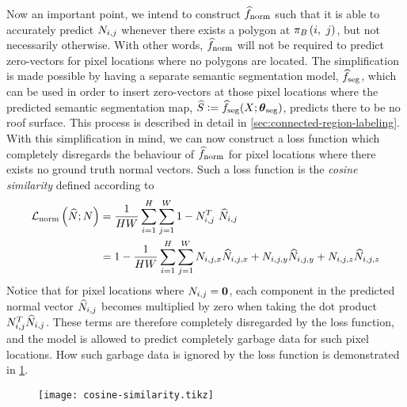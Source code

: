 Now an important point, we intend to construct $\widehat{f}_{\mathrm{norm}}$ such that it is able to accurately predict $N_{i,j}$ whenever there exists a polygon at $\pi_{B}\left(i,~j\right)$, but not necessarily otherwise.
With other words, $\widehat{f}_{\mathrm{norm}}$ will not be required to predict zero-vectors for pixel locations where no polygons are located.
The simplification is made possible by having a separate semantic segmentation model, $\widehat{f}_{\mathrm{seg}}$, which can be used in order to insert zero-vectors at those pixel locations where the predicted semantic segmentation map, $\widehat{S} \vcentcolon= \widehat{f}_{\mathrm{seg}}(X; \boldsymbol{\theta}_{\mathrm{seg}})$, predicts there to be no roof surface.
This process is described in detail in \cref{sec:connected-region-labeling}.
With this simplification in mind, we can now construct a loss function which completely disregards the behaviour of $\widehat{f}_{\mathrm{norm}}$ for pixel locations where there exists no ground truth normal vectors.
Such a loss function is the \textit{cosine similarity} defined according to
%
\begin{align*}
  \mathcal{L}_{\mathrm{norm}}\left(
    \widehat{N}; N
  \right)
  &=
  \frac{1}{HW}
  \sum_{i = 1}^{H}
  \sum_{j = 1}^{W}
  1 - N_{i,j}^T~\widehat{N}_{i,j}
  \\
  &=
  1 -
  \frac{1}{HW}
  \sum_{i = 1}^{H}
  \sum_{j = 1}^{W}
    N_{i,j,x} \widehat{N}_{i,j,x}
  + N_{i,j,y} \widehat{N}_{i,j,y}
  + N_{i,j,z} \widehat{N}_{i,j,z}
\end{align*}
%
Notice that for pixel locations where $N_{i,j} = \boldsymbol{0}$, each component in the predicted normal vector $\widehat{N}_{i,j}$ becomes multiplied by zero when taking the dot product $N_{i,j}^T \widehat{N}_{i,j}$.
These terms are therefore completely disregarded by the loss function, and the model is allowed to predict completely garbage data for such pixel locations.
How such garbage data is ignored by the loss function is demonstrated in \cref{fig:cosine-similarity-example}.
%
\begin{figure}[H]
  \centering
  \texttt{[image: cosine-similarity.tikz]}
  \label{fig:cosine-similarity-example}
\end{figure}
